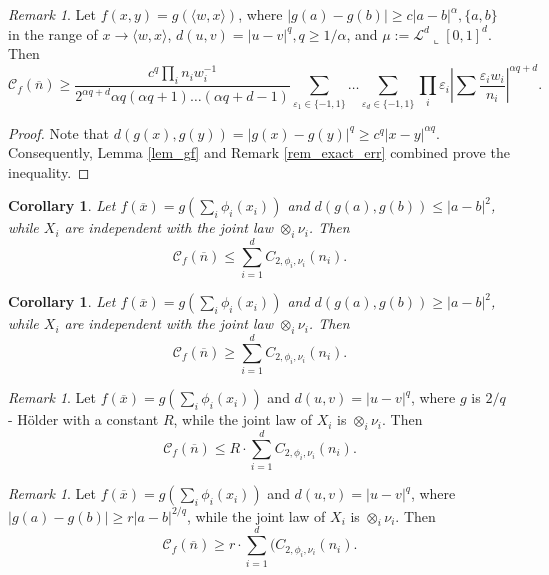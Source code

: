 \documentclass{amsart}
\newtheorem{corollary}[theorem]{Corollary}
\theoremstyle{remark}
\newtheorem{remark}[theorem]{Remark}
\numberwithin{equation}{section}
\numberwithin{figure}{section}
\def\eps{\varepsilon}
\def\v{\overline}
\newcommand{\res}{\llcorner}
\begin{document}
\begin{remark}
	Let $f(x, y) = g(\langle w, x \rangle)$, where $|g(a)-g(b)| \geq c |a-b|^{\alpha}, \{a, b\} $ in the range of $x\to \langle w, x \rangle$, $d(u, v) = |u-v|^q, q\geq 1/\alpha$, and $\mu:=\mathcal{L}^d\res [0,1]^d$. Then
	\[
	\mathcal{C}_f(\v n) \geq \frac{c^q \prod_i n_i w_i^{-1}}{2^{\alpha q+d} \alpha q(\alpha q+1) \ldots (\alpha q+d-1)} \sum_{\eps_1 \in \{-1, 1\}} \ldots \sum_{\eps_d \in \{-1, 1\}} \prod_i \eps_{i} \left|\sum \frac{\eps_i w_i}{n_i}\right|^{\alpha q+d}.
	\]
\end{remark}	
\begin{proof}
	Note that $d(g(x), g(y)) = |g(x)-g(y)|^q \geq c^q |x-y|^{\alpha q}$. Consequently, Lemma \ref{lem_gf} and Remark \ref{rem_exact_err} combined prove the inequality.	
\end{proof}	

\begin{corollary}
	Let $f(\v x) = g(\sum_i \phi_i(x_i))$ and $d(g(a), g(b)) \leq |a-b|^2$, while $X_i$ are independent with the joint law $\otimes_i \nu_i$. Then 
	\[
	\mathcal{C}_f(\v n) \leq \sum_{i=1}^d C_{2,\phi_i,\nu_i}(n_i).
	\]
\end{corollary}	
\begin{corollary}
	Let $f(\v x) = g( \sum_i \phi_i(x_i))$ and $d(g(a), g(b)) \geq |a-b|^2$, while $X_i$ are independent with the joint law $\otimes_i \nu_i$. Then 
	\[
	\mathcal{C}_f(\v n) \geq \sum_{i=1}^d C_{2,\phi_i, \nu_i}(n_i).
	\]
\end{corollary}
\begin{remark}
	\label{holder_upper_bound}
	Let $f(\v x) = g( \sum_i \phi_i(x_i))$ and $d(u, v) = |u-v|^q$, where $g$ is $2/q$ - H\" older with a constant $R$, while the joint law of $X_i$ is $\otimes_i \nu_i$. Then
	\[
	\mathcal{C}_f(\v n) \leq R \cdot \sum_{i=1}^d C_{2,\phi_i, \nu_i}(n_i).
	\]
\end{remark}	
\begin{remark}
	\label{holder_lower_bound}
	Let $f(\v x) = g( \sum_i \phi_i(x_i))$ and $d(u, v) = |u-v|^q$, where $|g(a) - g(b)| \geq r |a-b|^{2/q}$, while the joint law of $X_i$ is $\otimes_i \nu_i$. Then
	\[
	\mathcal{C}_f(\v n) \geq r \cdot \sum_{i=1}^d (C_{2,\phi_i, \nu_i}(n_i).
	\]
\end{remark}	
\end{document}
